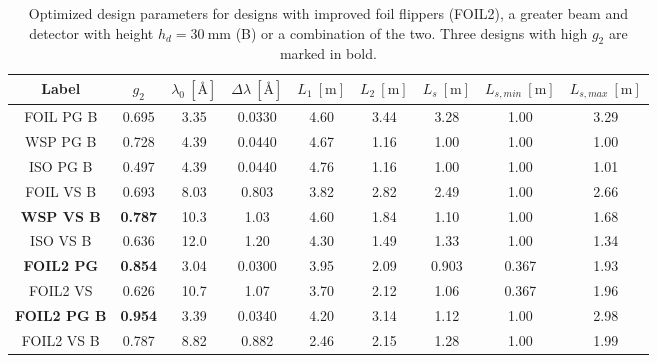 \begin{table}[h!]
\centering
\begin{tabular}{c | c | c c c c c | c c}
	\toprule
	Label & $g_2$ & $\lambda_0 ~[\unit{\angstrom}]$ & $\Delta\lambda ~[\unit{\angstrom}]$ & $L_1 ~[\unit{\meter}]$ & $L_2 ~[\unit{\meter}]$ & $L_s  ~[\unit{\meter}]$ & $L_{s,min}  ~[\unit{\meter}]$& $L_{s, max}  ~[\unit{\meter}]$\\
	\midrule
	FOIL PG B & \num{0.695} & \num{3.35} & \num{0.0330} & \num{4.60} & \num{3.44} & \num{3.28} & \num{1.00} & \num{3.29} \\
	WSP PG B & \num{0.728} & \num{4.39} & \num{0.0440} & \num{4.67} & \num{1.16} & \num{1.00} & \num{1.00} & \num{1.00} \\
	ISO PG B & \num{0.497} & \num{4.39} & \num{0.0440} & \num{4.76} & \num{1.16} & \num{1.00} & \num{1.00} & \num{1.01} \\
	FOIL VS B & \num{0.693} & \num{8.03} & \num{0.803} & \num{3.82} & \num{2.82} & \num{2.49} & \num{1.00} & \num{2.66} \\
	\textbf{WSP VS B} & \textbf{0.787} & \num{10.3} & \num{1.03} & \num{4.60} & \num{1.84} & \num{1.10} & \num{1.00} & \num{1.68} \\
	ISO VS B & \num{0.636} & \num{12.0} & \num{1.20} & \num{4.30} & \num{1.49} & \num{1.33} & \num{1.00} & \num{1.34} \\
	\midrule
	\textbf{FOIL2 PG} & \textbf{0.854} & \num{3.04} & \num{0.0300} & \num{3.95} & \num{2.09} & \num{0.903} & \num{0.367} & \num{1.93} \\
	FOIL2 VS & \num{0.626} & \num{10.7} & \num{1.07} & \num{3.70} & \num{2.12} & \num{1.06} & \num{0.367} & \num{1.96} \\
	\textbf{FOIL2 PG B} & \textbf{0.954} & \num{3.39} & \num{0.0340} & \num{4.20} & \num{3.14} & \num{1.12} & \num{1.00} & \num{2.98} \\
	FOIL2 VS B & \num{0.787} & \num{8.82} & \num{0.882} & \num{2.46} & \num{2.15} & \num{1.28} & \num{1.00} & \num{1.99} \\
	\bottomrule
\end{tabular}
\caption{Optimized design parameters for designs with improved foil flippers (FOIL2), a greater beam and detector with height $h_d = \SI{30}{\milli\meter}$ (B) or a combination of the two. Three designs with high $g_2$ are marked in bold.}
\label{tab:optimized-designs-boost}
\end{table}

